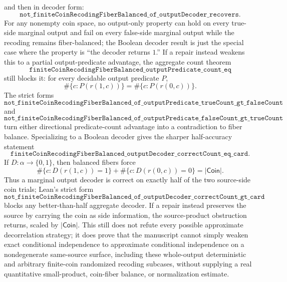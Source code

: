 \documentclass[11pt]{article}
\theoremstyle{remark}
\begin{document}
and then in decoder form:
\[
  \texttt{not\_finiteCoinRecodingFiberBalanced\_of\_outputDecoder\_recovers}.
\]
For any nonempty coin space, no output-only property can hold on every
true-side marginal output and fail on every false-side marginal output while
the recoding remains fiber-balanced; the Boolean decoder result is just the
special case where the property is ``the decoder returns \(1\).''  If a repair
instead weakens this to a partial output-predicate advantage, the aggregate
count theorem
\[
  \texttt{finiteCoinRecodingFiberBalanced\_outputPredicate\_count\_eq}
\]
still blocks it: for every decidable output predicate \(P\),
\[
  \#\{c:P(r(1,c))\}=\#\{c:P(r(0,c))\}.
\]
The strict forms
\[
  \texttt{not\_finiteCoinRecodingFiberBalanced\_of\_outputPredicate\_trueCount\_gt\_falseCount}
\]
and
\[
  \texttt{not\_finiteCoinRecodingFiberBalanced\_of\_outputPredicate\_falseCount\_gt\_trueCount}
\]
turn either directional predicate-count advantage into a contradiction to
fiber balance.  Specializing to a Boolean decoder gives the sharper
half-accuracy statement
\[
  \texttt{finiteCoinRecodingFiberBalanced\_outputDecoder\_correctCount\_eq\_card}.
\]
If \(D:\alpha\to\{0,1\}\), then balanced fibers force
\[
  \#\{c:D(r(1,c))=1\}+\#\{c:D(r(0,c))=0\}=|\mathsf{Coin}|.
\]
Thus a marginal output decoder is correct on exactly half of the two
source-side coin trials; Lean's strict form
\[
  \texttt{not\_finiteCoinRecodingFiberBalanced\_of\_outputDecoder\_correctCount\_gt\_card}
\]
blocks any better-than-half aggregate decoder.  If a repair instead preserves
the source by carrying the coin as side information, the source-product
obstruction returns, scaled by \(|\mathsf{Coin}|\).
This still does not refute every possible approximate
decorrelation strategy; it does prove that the manuscript cannot simply weaken
exact conditional independence to approximate conditional independence on a
nondegenerate same-source surface, including these whole-output deterministic
and arbitrary finite-coin randomized recoding subcases, without supplying a real
quantitative small-product, coin-fiber balance, or normalization estimate.
\end{document}
